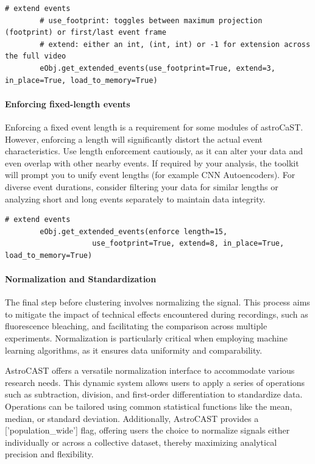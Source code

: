 \documentclass[utf8]{FrontiersinHarvard}
\newcommand{\inlineBash}[1]{%
    \begingroup
    \edef\temp{#1}%
    \expandafter\StrSubstitute\expandafter{\temp}{--}{-{-}}[\temp]%
    \tcbox[on line, boxsep=0pt, left=1pt, right=1pt, top=1pt, bottom=1pt,
        boxrule=0pt, arc=0pt, outer arc=0pt, colback=lightgray]{
        \texttt{\small \temp}
    }%
    \endgroup
}
\newcommand{\inlinepy}[1]{\inlineBash{#1}}
\begin{document}
    \begin{lstlisting}[style=pyStyle]
        # extend events
        # use_footprint: toggles between maximum projection (footprint) or first/last event frame
        # extend: either an int, (int, int) or -1 for extension across the full video
        eObj.get_extended_events(use_footprint=True, extend=3, in_place=True, load_to_memory=True)
    \end{lstlisting}

    \paragraph{Enforcing fixed-length events}
    \label{par:enforcing-length}
    Enforcing a fixed event length is a requirement for some modules of astroCaST. However, enforcing a length will significantly distort the actual event characteristics. Use length enforcement cautiously, as it can alter your data and even overlap with other nearby events. If required by your analysis, the toolkit will prompt you to unify event lengths (for example \ac{CNN} Autoencoders). For diverse event durations, consider filtering your data for similar lengths or analyzing short and long events separately to maintain data integrity.

    \begin{lstlisting}[style=pyStyle]
        # extend events
        eObj.get_extended_events(enforce length=15,
                    use_footprint=True, extend=8, in_place=True, load_to_memory=True)
    \end{lstlisting}

    \paragraph{Normalization and Standardization}
    The final step before clustering involves normalizing the signal. This process aims to mitigate the impact of technical effects encountered during recordings, such as fluorescence bleaching, and facilitating the comparison across multiple experiments. Normalization is particularly critical when employing machine learning algorithms, as it ensures data uniformity and comparability.

    AstroCAST offers a versatile normalization interface to accommodate various research needs. This dynamic system allows users to apply a series of operations such as subtraction, division, and first-order differentiation to standardize data. Operations can be tailored using common statistical functions like the mean, median, or standard deviation. Additionally, AstroCAST provides a \inlinepy{'population\_wide'} flag, offering users the choice to normalize signals either individually or across a collective dataset, thereby maximizing analytical precision and flexibility.
\end{document}
